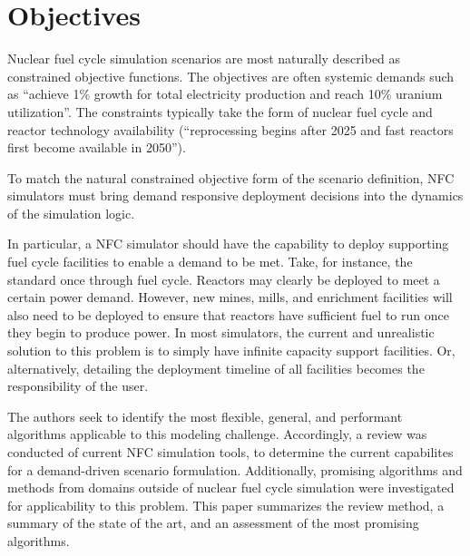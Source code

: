 \section{Objectives}
        Nuclear fuel cycle simulation scenarios are most naturally described as 
        constrained objective functions. The objectives are often systemic 
        demands such as ``achieve 1\% growth for total electricity production 
        and reach 10\% uranium utilization''. The constraints typically take 
        the form of nuclear fuel cycle and reactor technology availability 
        (``reprocessing begins after 2025 and fast reactors first become 
        available in 2050'').

        To match the natural constrained objective form of the scenario 
        definition, \gls{NFC} simulators must bring demand responsive 
        deployment decisions into the dynamics of the simulation logic.

        In particular, a \gls{NFC} simulator should have the 
        capability to deploy supporting fuel cycle facilities to enable 
        a demand to be met. Take, for instance, the standard once through fuel 
        cycle. Reactors may clearly be deployed to meet a certain power demand. 
        However, new mines, mills, and enrichment facilities will also need to be 
        deployed to ensure that reactors have sufficient fuel to run once they 
        begin to produce power. In most simulators, the current and unrealistic 
        solution to this problem is to simply have infinite capacity support 
        facilities. Or, alternatively, detailing the deployment timeline of all 
        facilities becomes the responsibility of the user.

        The authors seek to identify the most flexible, general, and performant 
        algorithms applicable to this modeling challenge.  Accordingly, a review was 
        conducted of current \gls{NFC} simulation tools, to determine the 
        current capabilites for a demand-driven scenario formulation.  
        Additionally, promising algorithms and methods from domains outside of 
        nuclear fuel cycle simulation were investigated for applicability to 
        this problem. This paper summarizes the review method, a summary of the 
        state of the art, and an assessment of the most promising algorithms.
